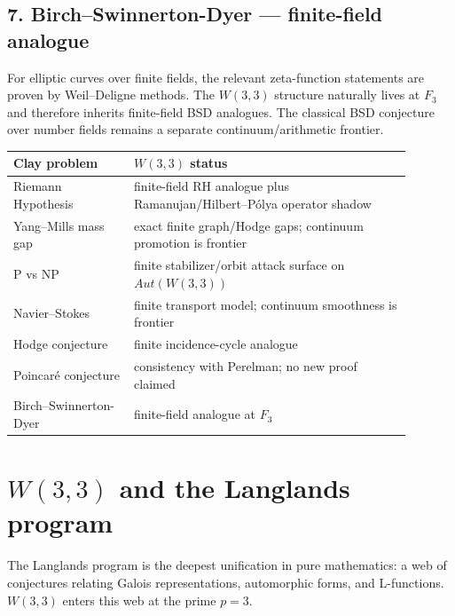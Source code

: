 \documentclass[11pt]{article}
\def\mathbb#1{#1}%
\def\mathrm#1{#1}%
\begin{document}
\subsection*{7. Birch--Swinnerton-Dyer --- finite-field analogue}

For elliptic curves over finite fields, the relevant zeta-function statements are proven by Weil--Deligne methods. The $W(3,3)$ structure naturally lives at $\mathbb{F}_3$ and therefore inherits finite-field BSD analogues. The classical BSD conjecture over number fields remains a separate continuum/arithmetic frontier.

\medskip

\begin{center}
\small
\renewcommand{\arraystretch}{1.3}
\begin{tabular}{>{\raggedright\arraybackslash}p{0.27\linewidth} >{\raggedright\arraybackslash}p{0.62\linewidth}}
\toprule
Clay problem & $W(3,3)$ status \\
\midrule
Riemann Hypothesis & finite-field RH analogue plus Ramanujan/Hilbert--Pólya operator shadow \\
Yang--Mills mass gap & exact finite graph/Hodge gaps; continuum promotion is frontier \\
P vs NP & finite stabilizer/orbit attack surface on $\mathrm{Aut}(W(3,3))$ \\
Navier--Stokes & finite transport model; continuum smoothness is frontier \\
Hodge conjecture & finite incidence-cycle analogue \\
Poincaré conjecture & consistency with Perelman; no new proof claimed \\
Birch--Swinnerton-Dyer & finite-field analogue at $\mathbb{F}_3$ \\
\bottomrule
\end{tabular}
\end{center}

\section{\texorpdfstring{$W(3,3)$ and the Langlands program}{W(3,3) and the Langlands program}}

\label{sec:langlands}

The Langlands program is the deepest unification in pure mathematics: a web of conjectures relating Galois representations, automorphic forms, and L-functions. $W(3,3)$ enters this web at the prime $p = 3$.
\end{document}

